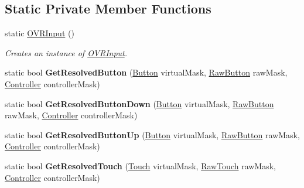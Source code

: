 \subsection*{Static Private Member Functions}
\begin{DoxyCompactItemize}
\item 
static \mbox{\hyperlink{class_o_v_r_input_a243b77bb05dd7621adb2fc3ae46f4283}{O\+V\+R\+Input}} ()
\begin{DoxyCompactList}\small\item\em Creates an instance of \mbox{\hyperlink{class_o_v_r_input}{O\+V\+R\+Input}}. \end{DoxyCompactList}\item 
\mbox{\label{class_o_v_r_input_ac24e90334b74b8c3ad07261060fd0236}} 
static bool {\bfseries Get\+Resolved\+Button} (\mbox{\hyperlink{class_o_v_r_input_aed3cf5b4b5e0669cea0941f61e018ee5}{Button}} virtual\+Mask, \mbox{\hyperlink{class_o_v_r_input_a9d6423af820e22b93f0b33a4fc4bf77a}{Raw\+Button}} raw\+Mask, \mbox{\hyperlink{class_o_v_r_input_a5c86f9052a9cbb0b73779ff5704d60a8}{Controller}} controller\+Mask)
\item 
\mbox{\label{class_o_v_r_input_a47d78a5ba8ea6977bf5aeca1e0240073}} 
static bool {\bfseries Get\+Resolved\+Button\+Down} (\mbox{\hyperlink{class_o_v_r_input_aed3cf5b4b5e0669cea0941f61e018ee5}{Button}} virtual\+Mask, \mbox{\hyperlink{class_o_v_r_input_a9d6423af820e22b93f0b33a4fc4bf77a}{Raw\+Button}} raw\+Mask, \mbox{\hyperlink{class_o_v_r_input_a5c86f9052a9cbb0b73779ff5704d60a8}{Controller}} controller\+Mask)
\item 
\mbox{\label{class_o_v_r_input_a495911ae3a540656845fa13ede056018}} 
static bool {\bfseries Get\+Resolved\+Button\+Up} (\mbox{\hyperlink{class_o_v_r_input_aed3cf5b4b5e0669cea0941f61e018ee5}{Button}} virtual\+Mask, \mbox{\hyperlink{class_o_v_r_input_a9d6423af820e22b93f0b33a4fc4bf77a}{Raw\+Button}} raw\+Mask, \mbox{\hyperlink{class_o_v_r_input_a5c86f9052a9cbb0b73779ff5704d60a8}{Controller}} controller\+Mask)
\item 
\mbox{\label{class_o_v_r_input_ac5aefd4ee27bf0bda9e1c3b6bf919a92}} 
static bool {\bfseries Get\+Resolved\+Touch} (\mbox{\hyperlink{class_o_v_r_input_a4e1f1eb856223383aefc1965dd2db39a}{Touch}} virtual\+Mask, \mbox{\hyperlink{class_o_v_r_input_a6e130faa2035c5b20853c1177d909cc6}{Raw\+Touch}} raw\+Mask, \mbox{\hyperlink{class_o_v_r_input_a5c86f9052a9cbb0b73779ff5704d60a8}{Controller}} controller\+Mask)

\end{DoxyCompactItemize}
